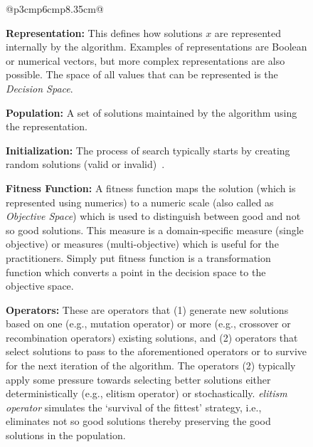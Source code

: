 \documentclass[sigconf,anonymous,review]{acmart}
\newcommand\TODO[1]{\textcolor{ScarletRed}{\textbf{\colorbox{yellow}{\small TODO:}} \emph{#1}}\xspace}
\begin{document}
\begin{figure}
{\begin{tabular}{@{}p{3cm}p{6cm}p{8.35cm}@{}}
{\begin{minipage}[b]{\linewidth}
                \textbf{Representation: } {This defines how solutions $x$ are represented internally by the algorithm.
                Examples of representations are Boolean or numerical vectors, but more complex representations are also possible. The space of all values that can be represented is the} \textit{Decision Space}.
                
                \textbf{Population: } A set of solutions maintained by the algorithm using the representation.
                
                \textbf{Initialization: } The process of search {typically} starts by creating random solutions (valid or invalid)~\cite{saber2017seeding, chen2017beyond, chen2017sampling, henard2015combining}.
                
                \textbf{Fitness Function: } A fitness function maps the solution (which is represented using numerics) to a numeric scale (also called as \textit{Objective Space}) which is used to distinguish between good and not so good solutions. This measure is a domain-specific measure (single objective) or measures (multi-objective) which is useful for the practitioners.
                Simply put fitness function is a transformation function which converts a point in the decision space to the objective space. 
                
                \textbf{Operators: } {These are operators that (1) generate new solutions based on one (e.g., mutation operator) or more (e.g., crossover or recombination operators) existing solutions, and (2) operators that select solutions to pass to the aforementioned operators or to survive for the next iteration of the algorithm. The operators (2) typically apply some pressure towards selecting better solutions either deterministically (e.g., elitism operator) or stochastically.} 
                \textit{elitism operator} simulates the `survival of the fittest' strategy, i.e., eliminates not so good solutions thereby preserving the good solutions in the population. 
                

\end{minipage}}
\end{tabular}}
\end{figure}
\end{document}
